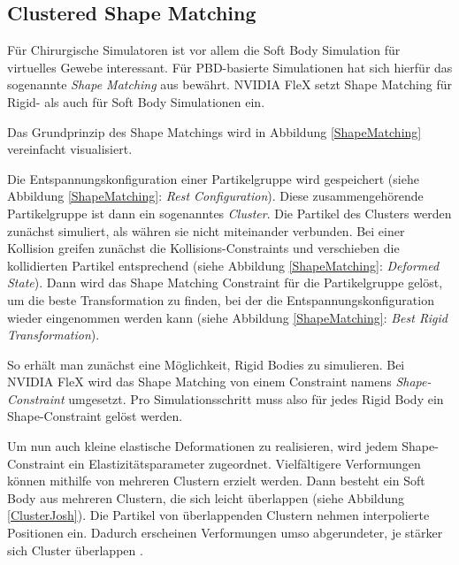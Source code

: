 \subsection{Clustered Shape Matching}

Für Chirurgische Simulatoren ist vor allem die Soft Body Simulation für virtuelles Gewebe interessant. Für PBD-basierte Simulationen hat sich hierfür das sogenannte \textit{Shape Matching} aus \cite{Shape} bewährt. NVIDIA FleX setzt Shape Matching für Rigid- als auch für Soft Body Simulationen ein.

Das Grundprinzip des Shape Matchings wird in Abbildung \ref{ShapeMatching} vereinfacht visualisiert. 


Die Entspannungskonfiguration einer Partikelgruppe wird gespeichert (siehe Abbildung \ref{ShapeMatching}: \textit{Rest Configuration}). Diese zusammengehörende Partikelgruppe ist dann ein sogenanntes \textit{Cluster}. 
Die Partikel des Clusters werden zunächst simuliert, als währen sie nicht miteinander verbunden.
Bei einer Kollision greifen zunächst die Kollisions-Constraints und verschieben die kollidierten Partikel entsprechend (siehe Abbildung \ref{ShapeMatching}: \textit{Deformed State}). Dann wird das Shape Matching Constraint für die Partikelgruppe gelöst, um die beste Transformation zu finden, bei der die Entspannungskonfiguration wieder eingenommen werden kann (siehe Abbildung \ref{ShapeMatching}: \textit{Best Rigid Transformation}).

So erhält man zunächst eine Möglichkeit, Rigid Bodies zu simulieren. Bei NVIDIA FleX wird das Shape Matching von einem Constraint namens \textit{Shape-Constraint} umgesetzt. Pro Simulationsschritt muss also für jedes Rigid Body ein Shape-Constraint gelöst werden.

Um nun auch kleine elastische Deformationen zu realisieren, wird jedem Shape-Constraint ein 
Elastizitätsparameter
zugeordnet. Vielfältigere Verformungen können mithilfe von mehreren Clustern erzielt werden. Dann besteht ein Soft Body aus mehreren Clustern, die sich leicht überlappen (siehe Abbildung \ref{ClusterJosh}). Die Partikel von überlappenden Clustern nehmen interpolierte Positionen ein. Dadurch erscheinen Verformungen umso abgerundeter, je stärker sich Cluster überlappen \cite{FlexDoc}.

